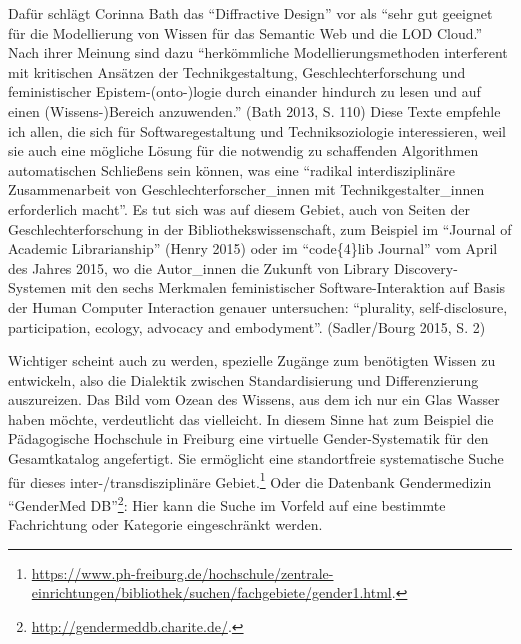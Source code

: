 Dafür schlägt Corinna Bath das \enquote{Diffractive Design} vor als
\enquote{sehr gut geeignet für die Modellierung von Wissen für das
Semantic Web und die LOD Cloud.} Nach ihrer Meinung sind dazu
\enquote{herkömmliche Modellierungsmethoden interferent mit kritischen
Ansätzen der Technikgestaltung, Geschlechterforschung und feministischer
Epistem-(onto-)logie durch einander hindurch zu lesen und auf einen
(Wissens-)Bereich anzuwenden.} (Bath 2013, S. 110) Diese Texte empfehle
ich allen, die sich für Softwaregestaltung und Techniksoziologie
interessieren, weil sie auch eine mögliche Lösung für die notwendig zu
schaffenden Algorithmen automatischen Schließens sein können, was eine
\enquote{radikal interdisziplinäre Zusammenarbeit von
Geschlechterforscher\_innen mit Technikgestalter\_innen erforderlich
macht}. Es tut sich was auf diesem Gebiet, auch von Seiten der
Geschlechterforschung in der Bibliothekswissenschaft, zum Beispiel im
\enquote{Journal of Academic Librarianship} (Henry 2015) oder im
\enquote{code\{4\}lib Journal} vom April des Jahres 2015, wo die
Autor\_innen die Zukunft von Library Discovery-Systemen mit den sechs
Merkmalen feministischer Software-Interaktion auf Basis der Human
Computer Interaction genauer untersuchen: \enquote{plurality,
self-disclosure, participation, ecology, advocacy and embodyment}.
(Sadler/Bourg 2015, S. 2)

Wichtiger scheint auch zu werden, spezielle Zugänge zum benötigten
Wissen zu entwickeln, also die Dialektik zwischen Standardisierung und
Differenzierung auszureizen. Das Bild vom Ozean des Wissens, aus dem ich
nur ein Glas Wasser haben möchte, verdeutlicht das vielleicht. In diesem
Sinne hat zum Beispiel die Pädagogische Hochschule in Freiburg eine
virtuelle Gender-Systematik für den Gesamtkatalog angefertigt. Sie
ermöglicht eine standortfreie systematische Suche für dieses
inter-/transdisziplinäre Gebiet.\footnote{\url{https://www.ph-freiburg.de/hochschule/zentrale-einrichtungen/bibliothek/suchen/fachgebiete/gender1.html}.}
Oder die Datenbank Gendermedizin \enquote{GenderMed DB}\footnote{\url{http://gendermeddb.charite.de/}.}:
Hier kann die Suche im Vorfeld auf eine bestimmte Fachrichtung oder
Kategorie eingeschränkt werden.

